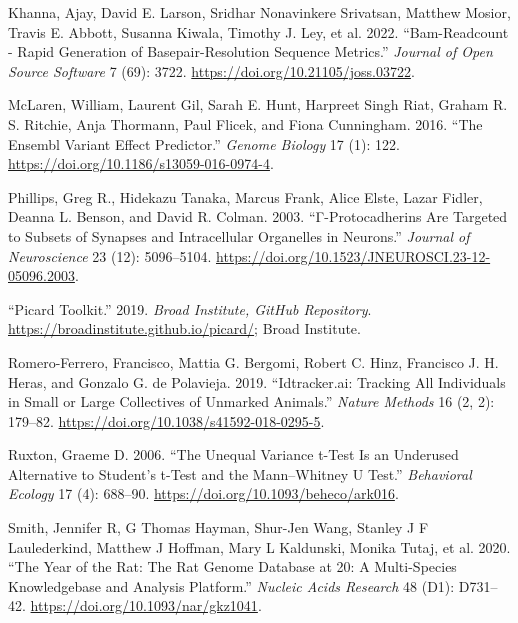 \documentclass[
]{book}
\newlength{\cslhangindent}
\newlength{\cslentryspacingunit} %
\newenvironment{CSLReferences}[2] %
 {%
  \setlength{\parindent}{0pt}
  \ifodd #1
  \let\oldpar\par
  \def\par{\hangindent=\cslhangindent\oldpar}
  \fi
  \setlength{\parskip}{#2\cslentryspacingunit}
 }%
 {}
\begin{document}
\begin{CSLReferences}{1}{0}
\leavevmode{}%
Khanna, Ajay, David E. Larson, Sridhar Nonavinkere Srivatsan, Matthew Mosior, Travis E. Abbott, Susanna Kiwala, Timothy J. Ley, et al. 2022. {``Bam-Readcount - Rapid Generation of Basepair-Resolution Sequence Metrics.''} \emph{Journal of Open Source Software} 7 (69): 3722. \url{https://doi.org/10.21105/joss.03722}.

\leavevmode{}%
McLaren, William, Laurent Gil, Sarah E. Hunt, Harpreet Singh Riat, Graham R. S. Ritchie, Anja Thormann, Paul Flicek, and Fiona Cunningham. 2016. {``The {Ensembl Variant Effect Predictor}.''} \emph{Genome Biology} 17 (1): 122. \url{https://doi.org/10.1186/s13059-016-0974-4}.

\leavevmode{}%
Phillips, Greg R., Hidekazu Tanaka, Marcus Frank, Alice Elste, Lazar Fidler, Deanna L. Benson, and David R. Colman. 2003. {``Γ-{Protocadherins Are Targeted} to {Subsets} of {Synapses} and {Intracellular Organelles} in {Neurons}.''} \emph{Journal of Neuroscience} 23 (12): 5096--5104. \url{https://doi.org/10.1523/JNEUROSCI.23-12-05096.2003}.

\leavevmode{}%
{``Picard Toolkit.''} 2019. \emph{Broad Institute, GitHub Repository}. \url{https://broadinstitute.github.io/picard/}; Broad Institute.

\leavevmode{}%
Romero-Ferrero, Francisco, Mattia G. Bergomi, Robert C. Hinz, Francisco J. H. Heras, and Gonzalo G. de Polavieja. 2019. {``Idtracker.ai: Tracking All Individuals in Small or Large Collectives of Unmarked Animals.''} \emph{Nature Methods} 16 (2, 2): 179--82. \url{https://doi.org/10.1038/s41592-018-0295-5}.

\leavevmode{}%
Ruxton, Graeme D. 2006. {``The Unequal Variance t-Test Is an Underused Alternative to {Student}'s t-Test and the {Mann}--{Whitney U} Test.''} \emph{Behavioral Ecology} 17 (4): 688--90. \url{https://doi.org/10.1093/beheco/ark016}.

\leavevmode{}%
Smith, Jennifer R, G Thomas Hayman, Shur-Jen Wang, Stanley J F Laulederkind, Matthew J Hoffman, Mary L Kaldunski, Monika Tutaj, et al. 2020. {``The {Year} of the {Rat}: {The Rat Genome Database} at 20: A Multi-Species Knowledgebase and Analysis Platform.''} \emph{Nucleic Acids Research} 48 (D1): D731--42. \url{https://doi.org/10.1093/nar/gkz1041}.


\end{CSLReferences}
\end{document}
